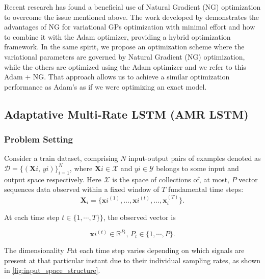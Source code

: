 Recent research has found a beneficial use of Natural Gradient (NG) optimization to overcome the issue mentioned above. The work developed by \cite{pmlr-v84-salimbeni18a} demonstrates the advantages of NG for variational GPs optimization with minimal effort and how to combine it with the Adam optimizer, providing a hybrid optimization framework. In the same spirit, we propose an optimization scheme where the variational parameters are governed by Natural Gradient (NG) optimization, while the others are optimized using the Adam optimizer and we refer to this Adam + NG. That approach allows us to achieve a similar optimization performance as Adam's as if we were optimizing an exact model.


\subsection{Adaptative Multi-Rate LSTM (AMR LSTM)}

\subsubsection{Problem Setting}

Consider a train dataset, comprising \(N\) input-output pairs of examples denoted as  $\mathcal{D} = \{(\boldsymbol{X}{i},\,y{i})\}_{i=1}^N$, where 
$\boldsymbol{X}{i}\in\mathcal{X}$ and $y{i}\in\mathcal{Y}$ belongs to some input and output space respectively. Here $\mathcal{X}$ is the space of collections of, at most, \(P\) vector sequences data observed within a fixed window of \(T\) fundamental time steps:
\[
\boldsymbol{X}_i
= \bigl\{\boldsymbol{x}{i}^{(1)}, \dots, \boldsymbol{x}{i}^{(t)}, \dots,\boldsymbol{x}_{i}^{(T)}\bigr\}.
\]

At each time step \(t \in \{1, \cdots, T\}\}\), the observed vector is

\[
\boldsymbol{x}{i}^{(t)} \in \mathbb{R}^{P_t},\,P_t \in \{1, \cdots, P\}.
\]

The dimensionality \(P\)​ at each time step varies depending on which signals are present at that particular instant due to their individual sampling rates, as shown in \cref{fig:input_space_structure}.

